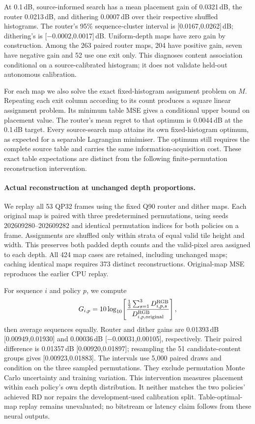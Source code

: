 At 0.1\,dB, source-informed search has a mean placement gain of 0.0321\,dB,
the router 0.0213\,dB, and dithering 0.0007\,dB over their respective shuffled
histograms. The router's 95\% sequence-cluster interval is
[0.0167,0.0262]\,dB; dithering's is [$-0.0002$,0.0017]\,dB. Uniform-depth
maps have zero gain by construction. Among the 263 paired router maps,
204 have positive gain, seven have negative gain and 52 use one exit only.
This diagnoses content association conditional on a source-calibrated
histogram; it does not validate held-out autonomous calibration.

For each map we also solve the exact fixed-histogram assignment problem on
$M$. Repeating each exit column according to its count produces a square
linear assignment problem. Its minimum table MSE gives a conditional upper
bound on placement value. The router's mean regret to that optimum is
0.0044\,dB at the 0.1\,dB target. Every source-search map attains its own
fixed-histogram optimum, as expected for a separable Lagrangian minimiser.
The optimum still requires the complete source table and carries the same
information-acquisition cost. These exact table expectations are distinct
from the following finite-permutation reconstruction intervention.

\paragraph{Actual reconstruction at unchanged depth proportions.}
We replay all 53 QP32 frames using the fixed Q90 router and dither maps.
Each original map is paired with three predetermined permutations,
using seeds 202609280--202609282 and identical permutation indices for
both policies on a frame. Assignments are shuffled only within strata of
equal valid tile height and width. This preserves both padded depth counts
and the valid-pixel area assigned to each depth. All 424 map cases are
retained, including unchanged maps; caching identical maps requires 373
distinct reconstructions. Original-map MSE reproduces the earlier CPU replay.

For sequence $i$ and policy $p$, we compute
\begin{equation}
 G_{i,p}=10\log_{10}\!\left[
 \frac{\frac13\sum_{s=1}^{3}D^{\rm RGB}_{i,p,s}}
 {D^{\rm RGB}_{i,p,\mathrm{original}}}\right],
\end{equation}
then average sequences equally. Router and dither gains are 0.01393\,dB
[0.00949,0.01930] and 0.00036\,dB [$-0.00031$,0.00105], respectively.
Their paired difference is 0.01357\,dB [0.00920,0.01897]; resampling the
51 candidate-content groups gives [0.00923,0.01883]. The intervals use
5,000 paired draws and condition on the three sampled permutations.
They exclude permutation Monte Carlo uncertainty and training variation.
This intervention measures placement within each policy's own depth
distribution. It neither matches the two policies' achieved RD nor repairs
the development-used calibration split. Table-optimal-map replay remains
unevaluated; no bitstream or latency claim follows from these neural outputs.

